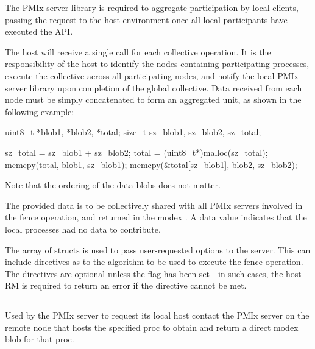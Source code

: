 \adviceimplstart
The \ac{PMIx} server library is required to aggregate participation by local clients, passing the request to the host environment once all local participants have executed the \ac{API}.
\adviceimplend

\advicermstart
The host will receive a single call for each collective operation. It is the responsibility of the host to identify the nodes containing participating processes, execute the collective across all participating nodes, and notify the local \ac{PMIx} server library upon completion of the global collective. Data received from each node must be simply concatenated to form an aggregated unit, as shown in the following example:

\cspecificstart
\begin{codepar}
uint8_t *blob1, *blob2, *total;
size_t sz_blob1, sz_blob2, sz_total;

sz_total = sz_blob1 + sz_blob2;
total = (uint8_t*)malloc(sz_total);
memcpy(total, blob1, sz_blob1);
memcpy(\&total[sz_blob1], blob2, sz_blob2);
\end{codepar}
\cspecificend

Note that the ordering of the data blobs does not matter.
\advicermend

The provided data is to be collectively shared with all \ac{PMIx} servers involved in the fence operation, and returned in the modex .
A  data value indicates that the local processes had no data to contribute.

The array of  structs is used to pass user-requested options to the server.
This can include directives as to the algorithm to be used to execute the fence operation.
The directives are optional unless the  flag has been set - in such cases, the host \ac{RM} is required to return an error if the directive cannot be met.


\subsection{}

\summary

Used by the PMIx server to request its local host contact the \ac{PMIx} server on the remote node that hosts the specified proc to obtain and return a direct modex blob for that proc.

\format

